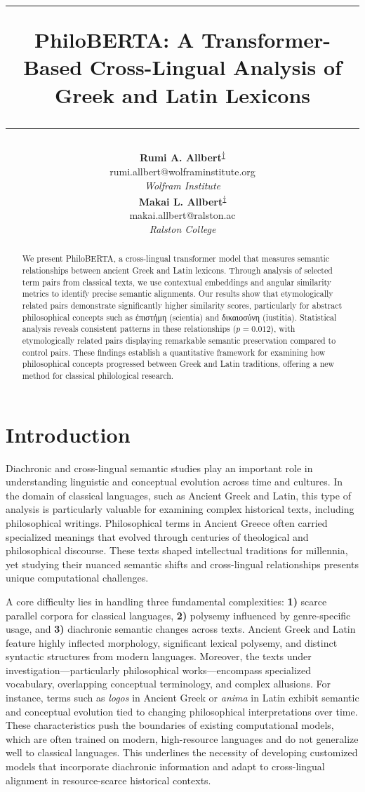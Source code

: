 \documentclass[11pt]{article} %
\title{
    \vspace{-2em}
    {\color{linecolor}\hrule height 0.5pt}
    \vspace{1.5em}
    {\LARGE \textbf{PhiloBERTA: A Transformer-Based Cross-Lingual Analysis of Greek and Latin Lexicons}}
    \vspace{1.5em}
    {\color{linecolor}\hrule height 0.5pt}
    \vspace{1em}
}
\author{
    \begin{minipage}{0.45\textwidth}
        \centering
        {\large \textbf{Rumi A. Allbert}\textsuperscript{\href{https://orcid.org/0009-0008-7963-4087}{†}}}\\[0.2em]
        {\small\ttfamily rumi.allbert@wolframinstitute.org}\\[0.2em]
        {\normalsize \textit{Wolfram Institute}}
    \end{minipage}%
    \hfill
    \begin{minipage}{0.45\textwidth}
        \centering
        {\large \textbf{Makai L. Allbert}\textsuperscript{\href{https://orcid.org/0000-0003-4756-0569}{†}}}\\[0.2em]
        {\small\ttfamily makai.allbert@ralston.ac}\\[0.2em]
        {\normalsize \textit{Ralston College}}
    \end{minipage}
}
\date{}
\begin{document}
\maketitle

\begin{abstract}
We present PhiloBERTA, a cross-lingual transformer model that measures semantic relationships between ancient Greek and Latin lexicons. Through analysis of selected term pairs from classical texts, we use contextual embeddings and angular similarity metrics to identify precise semantic alignments. Our results show that etymologically related pairs demonstrate significantly higher similarity scores, particularly for abstract philosophical concepts such as \textgreek{ἐπιστήμη} (scientia) and \textgreek{δικαιοσύνη} (iustitia). Statistical analysis reveals consistent patterns in these relationships ($p=0.012$), with etymologically related pairs displaying remarkable semantic preservation compared to control pairs. These findings establish a quantitative framework for examining how philosophical concepts progressed between Greek and Latin traditions, offering a new method for classical philological research.
\end{abstract}

\section{Introduction}
Diachronic and cross-lingual semantic studies play an important role in understanding linguistic and conceptual evolution across time and cultures. In the domain of classical languages, such as Ancient Greek and Latin, this type of analysis is particularly valuable for examining complex historical texts, including philosophical writings. Philosophical terms in Ancient Greece often carried specialized meanings that evolved through centuries of theological and philosophical discourse. These texts shaped intellectual traditions for millennia, yet studying their nuanced semantic shifts and cross-lingual relationships presents unique computational challenges.

A core difficulty lies in handling three fundamental complexities: \textbf{1)} scarce parallel corpora for classical languages, \textbf{2)} polysemy influenced by genre-specific usage, and \textbf{3)} diachronic semantic changes across texts. Ancient Greek and Latin feature highly inflected morphology, significant lexical polysemy, and distinct syntactic structures from modern languages. Moreover, the texts under investigation---particularly philosophical works---encompass specialized vocabulary, overlapping conceptual terminology, and complex allusions. For instance, terms such as \textit{logos} in Ancient Greek or \textit{anima} in Latin exhibit semantic and conceptual evolution tied to changing philosophical interpretations over time. These characteristics push the boundaries of existing computational models, which are often trained on modern, high-resource languages and do not generalize well to classical languages. This underlines the necessity of developing customized models that incorporate diachronic information and adapt to cross-lingual alignment in resource-scarce historical contexts.
\end{document}
